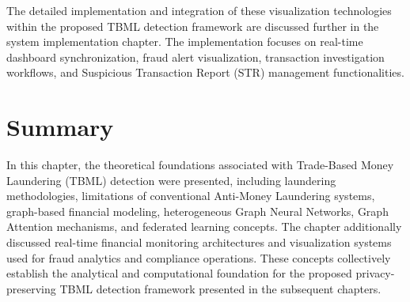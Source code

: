 \vspace{0.2cm}



The detailed implementation and integration of these visualization technologies within the proposed TBML detection framework are discussed further in the system implementation chapter. The implementation focuses on real-time dashboard synchronization, fraud alert visualization, transaction investigation workflows, and Suspicious Transaction Report (STR) management functionalities.


\section{Summary}
In this chapter, the theoretical foundations associated with Trade-Based Money Laundering (TBML) detection were presented, including laundering methodologies, limitations of conventional Anti-Money Laundering systems, graph-based financial modeling, heterogeneous Graph Neural Networks, Graph Attention mechanisms, and federated learning concepts. The chapter additionally discussed real-time financial monitoring architectures and visualization systems used for fraud analytics and compliance operations. These concepts collectively establish the analytical and computational foundation for the proposed privacy-preserving TBML detection framework presented in the subsequent chapters.
